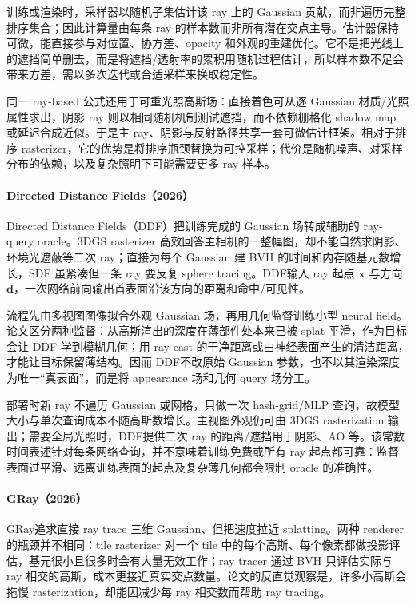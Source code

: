 训练或渲染时，采样器以随机子集估计该 ray 上的 Gaussian 贡献，而非遍历完整排序集合；因此计算量由每条 ray 的样本数而非所有潜在交点主导。估计器保持可微，能直接参与对位置、协方差、opacity 和外观的重建优化。它不是把光线上的遮挡简单删去，而是将遮挡/透射率的累积用随机过程估计，所以样本数不足会带来方差，需以多次迭代或合适采样来换取稳定性。

同一 ray-based 公式还用于可重光照高斯场：直接着色可从逐 Gaussian 材质/光照属性求出，阴影 ray 则以相同随机机制测试遮挡，而不依赖栅格化 shadow map 或延迟合成近似。于是主 ray、阴影与反射路径共享一套可微估计框架。相对于排序 rasterizer，它的优势是将排序瓶颈替换为可控采样；代价是随机噪声、对采样分布的依赖，以及复杂照明下可能需要更多 ray 样本。

\paragraph{Directed Distance Fields（2026）\cite{2606_00817}}
Directed Distance Fields（DDF）把训练完成的 Gaussian 场转成辅助的 ray-query oracle。3DGS rasterizer 高效回答主相机的一整幅图，却不能自然求阴影、环境光遮蔽等二次 ray；直接为每个 Gaussian 建 BVH 的时间和内存随基元数增长，SDF 虽紧凑但一条 ray 要反复 sphere tracing。DDF输入 ray 起点 $\mathbf x$ 与方向 $\mathbf d$，一次网络前向输出首表面沿该方向的距离和命中/可见性。

流程先由多视图图像拟合外观 Gaussian 场，再用几何监督训练小型 neural field。论文区分两种监督：从高斯渲出的深度在薄部件处本来已被 splat 平滑，作为目标会让 DDF 学到模糊几何；用 ray-cast 的干净距离或由神经表面产生的清洁距离，才能让目标保留薄结构。因而 DDF不改原始 Gaussian 参数，也不以其渲染深度为唯一“真表面”，而是将 appearance 场和几何 query 场分工。

部署时新 ray 不遍历 Gaussian 或网格，只做一次 hash-grid/MLP 查询，故模型大小与单次查询成本不随高斯数增长。主视图外观仍可由 3DGS rasterization 输出；需要全局光照时，DDF提供二次 ray 的距离/遮挡用于阴影、AO 等。该常数时间表述针对每条网络查询，并不意味着训练免费或所有 ray 起点都可靠：监督表面过平滑、远离训练表面的起点及复杂薄几何都会限制 oracle 的准确性。

\paragraph{GRay（2026）\cite{2606_30869}}
GRay追求直接 ray trace 三维 Gaussian、但把速度拉近 splatting。两种 renderer 的瓶颈并不相同：tile rasterizer 对一个 tile 中的每个高斯、每个像素都做投影评估，基元很小且很多时会有大量无效工作；ray tracer 通过 BVH 只评估实际与 ray 相交的高斯，成本更接近真实交点数量。论文的反直觉观察是，许多小高斯会拖慢 rasterization，却能因减少每 ray 相交数而帮助 ray tracing。

